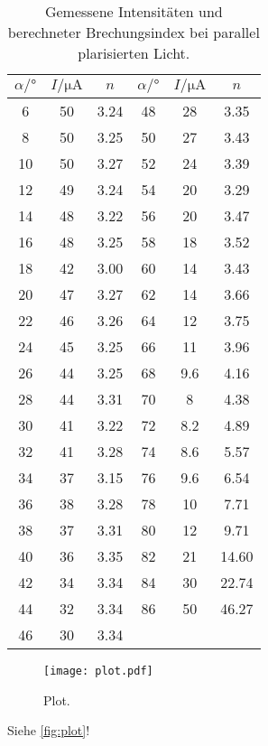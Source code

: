 \begin{table}[H]
  \centering
  \caption{Gemessene Intensitäten und berechneter Brechungsindex bei parallel plarisierten Licht.}
  \label{tab:senk}
  \begin{tabular}{c c c c c c}
    \toprule
    $\alpha /°$ & $I / \unit{\micro\ampere}$ & $n$ & $\alpha /°$ & $I / \unit{\micro\ampere}$ & $n$\\
    \midrule 
    6  &  50  & 3.24     & 48 &  28   &  3.35  \\ 
    8  &  50  & 3.25     & 50 &  27   &  3.43   \\
    10 &  50  & 3.27     & 52 &  24   &  3.39   \\
    12 &  49  & 3.24     & 54 &  20   &  3.29   \\
    14 &  48  & 3.22     & 56 &  20   &  3.47   \\
    16 &  48  & 3.25     & 58 &  18   &  3.52   \\
    18 &  42  & 3.00     & 60 &  14   &  3.43  \\
    20 &  47  & 3.27     & 62 &  14   &  3.66   \\
    22 &  46  & 3.26     & 64 &  12   &  3.75   \\
    24 &  45  & 3.25     & 66 &  11   &  3.96   \\
    26 &  44  & 3.25     & 68 &  9.6  &  4.16   \\
    28 &  44  & 3.31     & 70 &  8    &  4.38   \\
    30 &  41  & 3.22     & 72 &  8.2  &  4.89   \\
    32 &  41  & 3.28     & 74 &  8.6  &  5.57    \\
    34 &  37  & 3.15     & 76 &  9.6  &  6.54   \\
    36 &  38  & 3.28     & 78 &  10   &  7.71   \\
    38 &  37  & 3.31     & 80 &  12   &  9.71   \\
    40 &  36  & 3.35     & 82 &  21   &  14.60     \\
    42 &  34  & 3.34     & 84 &  30   &  22.74    \\
    44 &  32  & 3.34     & 86 &  50   &  46.27    \\
    46 &  30  & 3.34     &    &       &      \\
    \bottomrule
  \end{tabular}
\end{table}
            
    
    
    








\begin{figure}
  \centering
  \texttt{[image: plot.pdf]}
  \caption{Plot.}
  \label{fig:plot}
\end{figure}


Siehe \autoref{fig:plot}!

